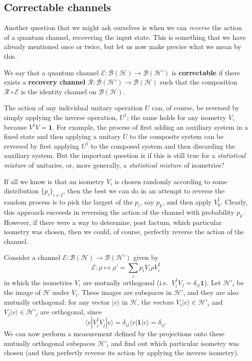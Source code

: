 \documentclass[fleqn]{article}
\newenvironment{idea}{\noindent}{\medskip}
\begin{document}
\hypertarget{correctable-channels}{%
\subsection{Correctable channels}\label{correctable-channels}}

Another question that we might ask ourselves is when we can \emph{reverse} the action of a quantum channel, recovering the input state.
This is something that we have already mentioned once or twice, but let us now make precise what we mean by this.

\begin{idea}
We say that a quantum channel \(\mathcal{E}\colon\mathcal{B}(\mathcal{H})\to\mathcal{B}(\mathcal{H}')\) is \textbf{correctable} if there exists a \textbf{recovery channel} \(\mathcal{R}\colon\mathcal{B}(\mathcal{H}')\to\mathcal{B}(\mathcal{H})\) such that the composition \(\mathcal{R}\circ\mathcal{E}\) is the identity channel on \(\mathcal{B}(\mathcal{H})\).

\end{idea}

The action of any individual unitary operation \(U\) can, of course, be reversed by simply applying the inverse operation, \(U^\dagger\);
the same holds for any isometry \(V\), because \(V^\dagger V=\mathbf{1}\).
For example, the process of first adding an auxiliary system in a fixed state and then applying a unitary \(U\) to the composite system can be reversed by first applying \(U^\dagger\) to the composed system and then discarding the auxiliary system.
But the important question is if this is still true for a \emph{statistical mixture} of unitaries, or, more generally, a \emph{statistical mixture} of isometries?

If all we know is that an isometry \(V_i\) is chosen randomly according to some distribution \(\{p_i\}_{i\in I}\), then the best we can do in an attempt to reverse the random process is to pick the largest of the \(p_i\), say \(p_k\), and then apply \(V_k^\dagger\).
Clearly, this approach succeeds in reversing the action of the channel with probability \(p_k\).
However, if there were a way to determine, post factum, which particular isometry was chosen, then we could, of course, perfectly reverse the action of the channel.

Consider a channel \(\mathcal{E}\colon\mathcal{B}(\mathcal{H})\to\mathcal{B}(\mathcal{H}')\) given by
\[
  \mathcal{E}\colon\rho
  \longmapsto \rho'
  = \sum_i p_i V_i\rho V^\dagger_i
\]
in which the isometries \(V_i\) are mutually orthogonal (i.e.~\(V_i^\dagger V_j =\delta_{ij}\mathbf{1}\)).
Let \(\mathcal{H}'_i\) be the image of \(\mathcal{H}\) under \(V_i\).
These images are subspaces in \(\mathcal{H}'\), and they are also mutually orthogonal: for any vector \(|v\rangle\) in \(\mathcal{H}\), the vectors \(V_i|v\rangle\in \mathcal{H}'_i\) and \(V_j|v\rangle\in \mathcal{H}'_j\) are orthogonal, since
\[
  \langle v|V_i^\dagger V_j|v\rangle
  = \delta_{ij} \langle v|\mathbf{1}|v\rangle
  = \delta_{ij}.
\]
We can now perform a measurement defined by the projections onto these mutually orthogonal subspaces \(\mathcal{H}'_i\) and find out which particular isometry was chosen (and then perfectly reverse its action by applying the inverse isometry).
\end{document}
